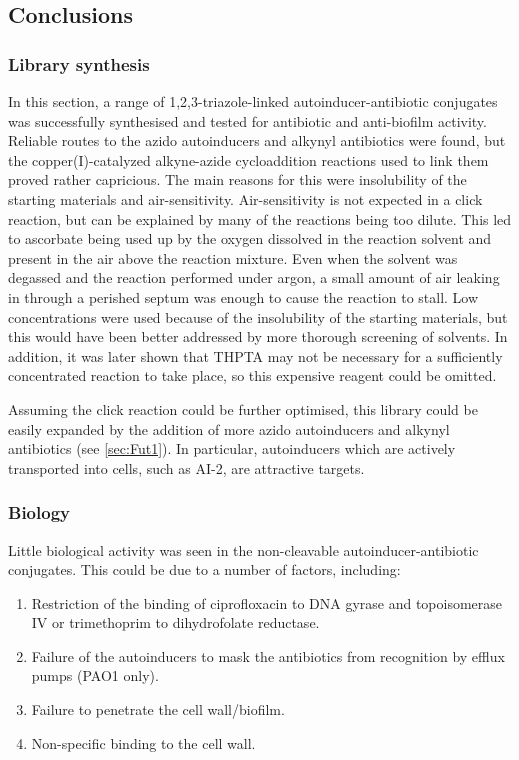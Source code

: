 \subsection{Conclusions}

\subsubsection{Library synthesis}

In this section, a range of 1,2,3-triazole-linked autoinducer-antibiotic conjugates was successfully synthesised and tested for antibiotic and anti-biofilm activity.
Reliable routes to the azido autoinducers and alkynyl antibiotics were found, but the copper(I)-catalyzed alkyne-azide cycloaddition reactions used to link them proved rather capricious.
The main reasons for this were insolubility of the starting materials and air-sensitivity. 
Air-sensitivity is not expected in a click reaction, but can be explained by many of the reactions being too dilute\cite{Hong2009}. 
This led to ascorbate being used up by the oxygen dissolved in the reaction solvent and present in the air above the reaction mixture. 
Even when the solvent was degassed and the reaction performed under argon, a small amount of air leaking in through a perished septum was enough to cause the reaction to stall.
Low concentrations were used because of the insolubility of the starting materials, but this would have been better addressed by more thorough screening of solvents.
In addition, it was later shown that THPTA may not be necessary for a sufficiently concentrated reaction to take place\cite{Stokes2017}, so this expensive reagent could be omitted.

Assuming the click reaction could be further optimised, this library could be easily expanded by the addition of more azido autoinducers and alkynyl antibiotics (see \ref{sec:Fut1}). In particular, autoinducers which are actively transported into cells, such as AI-2, are attractive targets.

\subsubsection{Biology}

Little biological activity was seen in the non-cleavable autoinducer-antibiotic conjugates. This could be due to a number of factors, including:

\begin{enumerate}
\item Restriction of the binding of ciprofloxacin  to DNA gyrase and topoisomerase IV\cite{Drlica1997} or trimethoprim  to dihydrofolate reductase\cite{Brogden1982}.

\item Failure of the autoinducers to mask the antibiotics from recognition by efflux pumps (PAO1 only).

\item Failure to penetrate the cell wall/biofilm.

\item Non-specific binding to the cell wall.
\end{enumerate}

